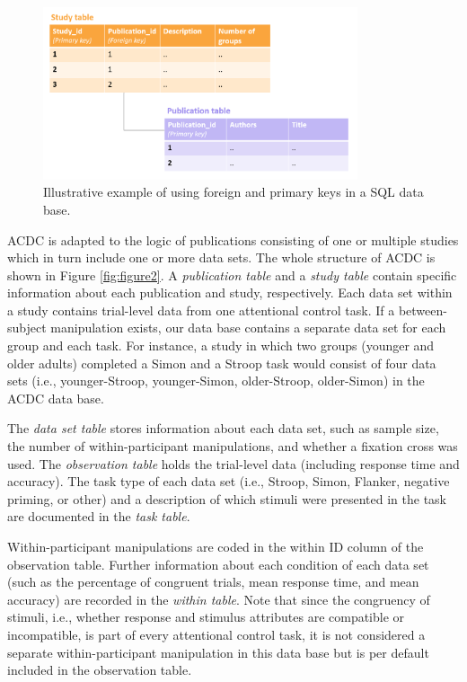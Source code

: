 \documentclass[
  man,floatsintext]{apa6}
\begin{document}
\begin{figure}

{\centering \includegraphics[width=350px]{images/illustrate_SQL_keys} 

}

\caption{Illustrative example of using foreign and primary keys in a SQL data base.}\label{fig:figure1}
\end{figure}

ACDC is adapted to the logic of publications consisting of one or multiple studies which in turn include one or more data sets. The whole structure of ACDC is shown in Figure \ref{fig:figure2}. A \emph{publication table} and a \emph{study table} contain specific information about each publication and study, respectively. Each data set within a study contains trial-level data from one attentional control task. If a between-subject manipulation exists, our data base contains a separate data set for each group and each task. For instance, a study in which two groups (younger and older adults) completed a Simon and a Stroop task would consist of four data sets (i.e., younger-Stroop, younger-Simon, older-Stroop, older-Simon) in the ACDC data base.

The \emph{data set table} stores information about each data set, such as sample size, the number of within-participant manipulations, and whether a fixation cross was used. The \emph{observation table} holds the trial-level data (including response time and accuracy). The task type of each data set (i.e., Stroop, Simon, Flanker, negative priming, or other) and a description of which stimuli were presented in the task are documented in the \emph{task table}.

Within-participant manipulations are coded in the within ID column of the observation table. Further information about each condition of each data set (such as the percentage of congruent trials, mean response time, and mean accuracy) are recorded in the \emph{within table}. Note that since the congruency of stimuli, i.e., whether response and stimulus attributes are compatible or incompatible, is part of every attentional control task, it is not considered a separate within-participant manipulation in this data base but is per default included in the observation table.
\end{document}
